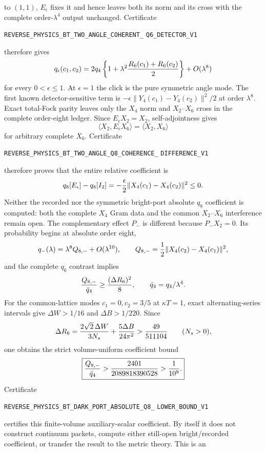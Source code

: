 \documentclass[11pt]{article}
\theoremstyle{definition}
\theoremstyle{remark}
\begin{document}
to $(1,1)$, $E_\epsilon$ fixes it and hence leaves both its norm and its cross
with the complete order-$\lambda^4$ output unchanged.  Certificate
\par\noindent
\texttt{REVERSE\_PHYSICS\_BT\_TWO\_ANGLE\_COHERENT\_}
\allowbreak\texttt{Q6\_DETECTOR\_V1}
\par\noindent
therefore gives
\[
 q_\epsilon(c_1,c_2)
 =2q_4\left\{1+\lambda^2{R_6(c_1)+R_6(c_2)\over2}\right\}
 +O(\lambda^8)
\]
for every $0<\epsilon\leq1$.  At $\epsilon=1$ the click is the pure
symmetric angle mode.  The first known detector-sensitive term is
$-\epsilon\|Y_4(c_1)-Y_4(c_2)\|^2/2$ at order $\lambda^8$.
Exact total-Fock parity leaves only the $X_4$ norm and $X_2$--$X_6$ cross in
the complete order-eight ledger.  Since $E_\epsilon X_2=X_2$,
self-adjointness gives
\[
 \langle X_2,E_\epsilon X_6\rangle=\langle X_2,X_6\rangle
\]
for arbitrary complete $X_6$.  Certificate
\par\noindent
\texttt{REVERSE\_PHYSICS\_BT\_TWO\_ANGLE\_Q8\_COHERENCE\_}
\allowbreak\texttt{DIFFERENCE\_V1}
\par\noindent
therefore proves that the entire relative coefficient is
\[
 q_8[E_\epsilon]-q_8[I_2]
 =-{\epsilon\over2}\|X_4(c_1)-X_4(c_2)\|^2\leq0.
\]
Neither the recorded nor the symmetric bright-port absolute $q_8$
coefficient is computed: both the complete $X_4$ Gram data and the common
$X_2$--$X_6$ interference remain open.  The complementary effect $P_-$ is
different because $P_-X_2=0$.  Its probability begins at absolute order
eight,
\[
 q_-(\lambda)=\lambda^8Q_{8,-}+O(\lambda^{10}),\qquad
 Q_{8,-}={1\over2}\|X_4(c_2)-X_4(c_1)\|^2,
\]
and the complete $q_6$ contrast implies
\[
 {Q_{8,-}\over\bar q_4}\geq{(\Delta R_6)^2\over8},
 \qquad \bar q_4=q_4/\lambda^4.
\]
For the common-lattice modes $c_1=0,c_2=3/5$ at $\kappa T=1$, exact
alternating-series intervals give $\Delta W>1/16$ and
$\Delta B>1/220$.  Since
\[
 \Delta R_6={2\sqrt2\,\Delta W\over3N_s}
 +{5\Delta B\over24\pi^2}>{49\over511104}
 \qquad(N_s>0),
\]
one obtains the strict volume-uniform coefficient bound
\[
 \boxed{{Q_{8,-}\over\bar q_4}
 >{2401\over2089818390528}>{1\over10^9}.}
\]
Certificate
\par\noindent
\texttt{REVERSE\_PHYSICS\_BT\_DARK\_PORT\_ABSOLUTE\_Q8\_}
\allowbreak\texttt{LOWER\_BOUND\_V1}
\par\noindent
certifies this finite-volume auxiliary-scalar coefficient.  By itself it does
not construct continuum packets, compute either still-open bright/recorded
coefficient, or transfer the result to the metric theory.  This is an
\end{document}

